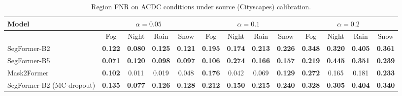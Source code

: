 \begin{table}[t]
\centering
\footnotesize
\setlength{\tabcolsep}{3pt}
\begin{tabular}{lcccccccccccc}
\toprule
Model & \multicolumn{4}{c}{$\alpha=0.05$} & \multicolumn{4}{c}{$\alpha=0.1$} & \multicolumn{4}{c}{$\alpha=0.2$} \\
\midrule
 & Fog & Night & Rain & Snow & Fog & Night & Rain & Snow & Fog & Night & Rain & Snow \\
\midrule
SegFormer-B2 & \textbf{0.122} & \textbf{0.080} & \textbf{0.125} & \textbf{0.121} & \textbf{0.195} & \textbf{0.174} & \textbf{0.213} & \textbf{0.226} & \textbf{0.348} & \textbf{0.320} & \textbf{0.405} & \textbf{0.361} \\
SegFormer-B5 & \textbf{0.071} & \textbf{0.120} & \textbf{0.098} & \textbf{0.097} & \textbf{0.106} & \textbf{0.274} & \textbf{0.166} & \textbf{0.157} & \textbf{0.219} & \textbf{0.445} & \textbf{0.351} & \textbf{0.239} \\
Mask2Former & \textbf{0.102} & 0.011 & 0.019 & 0.048 & \textbf{0.176} & 0.042 & 0.069 & \textbf{0.129} & \textbf{0.272} & 0.165 & 0.181 & \textbf{0.233} \\
SegFormer-B2 (MC-dropout) & \textbf{0.135} & \textbf{0.077} & \textbf{0.126} & \textbf{0.128} & \textbf{0.212} & \textbf{0.150} & \textbf{0.215} & \textbf{0.240} & \textbf{0.328} & \textbf{0.305} & \textbf{0.404} & \textbf{0.340} \\
\bottomrule
\end{tabular}
\caption{Region FNR on ACDC conditions under source (Cityscapes) calibration.}
\label{tab:breakdown}
\end{table}

